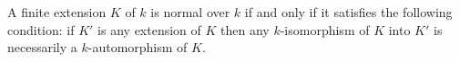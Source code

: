 A finite extension $K$ of $k$ is normal over $k$ if and only if it satisfies the following condition: if $K'$ is any extension of $K$ then any $k$-isomorphism of $K$ into $K'$ is necessarily a $k$-automorphism of $K$.
